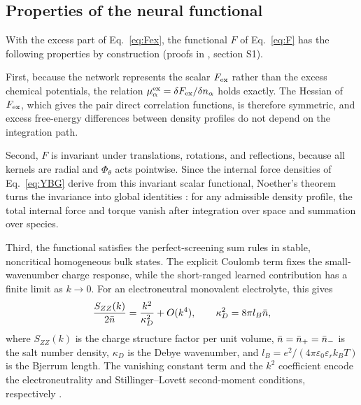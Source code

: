 \subsection*{Properties of the neural functional}
With the excess part of Eq.~\ref{eq:Fex}, the functional $F$ of Eq.~\ref{eq:F} has the following properties by construction (proofs in \siref, section S1).
 
First, because the network represents the scalar $F_{\rm ex}$ rather than the excess chemical potentials, the relation $\mu^{\rm ex}_\alpha=\delta F_{\rm ex}/\delta n_\alpha$ holds exactly. The Hessian of $F_{\rm ex}$, which gives the pair direct correlation functions, is therefore symmetric, and excess free-energy differences between density profiles do not depend on the integration path.
 
Second, $F$ is invariant under translations, rotations, and reflections, because all kernels are radial and $\Phi_\theta$ acts pointwise. Since the internal force densities of Eq.~\ref{eq:YBG} derive from this invariant scalar functional, Noether's theorem turns the invariance into global identities \cite{hermann2021noether}: for any admissible density profile, the total internal force and torque vanish after integration over space and summation over species.
 
Third, the functional satisfies the perfect-screening sum rules in stable, noncritical homogeneous bulk states. The explicit Coulomb term fixes the small-wavenumber charge response, while the short-ranged learned contribution has a finite limit as $k\to0$. For an electroneutral monovalent electrolyte, this gives
\begin{equation}
\frac{S_{ZZ}(k)}{2\bar n}
=\frac{k^2}{\kappa_D^2}+O(k^4),
\qquad
\kappa_D^2=8\pi l_B\bar n,
\label{eq:SL}
\end{equation}
where $S_{ZZ}(k)$ is the charge structure factor per unit volume, $\bar n=\bar n_+=\bar n_-$ is the salt number density, $\kappa_D$ is the Debye wavenumber, and $l_B=e^2/(4\pi\varepsilon_0\varepsilon_r k_BT)$ is the Bjerrum length. The vanishing constant term and the $k^2$ coefficient encode the electroneutrality and Stillinger--Lovett second-moment conditions, respectively \cite{stillinger1968general}.
 
